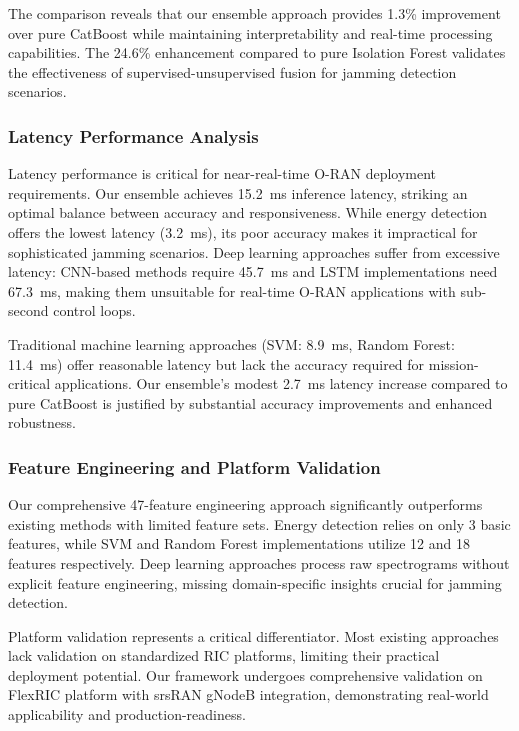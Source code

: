 \documentclass[journal]{IEEEtran}
\begin{document}
The comparison reveals that our ensemble approach provides 1.3\% improvement over pure CatBoost while maintaining interpretability and real-time processing capabilities. The 24.6\% enhancement compared to pure Isolation Forest validates the effectiveness of supervised-unsupervised fusion for jamming detection scenarios.

\subsubsection{Latency Performance Analysis}

Latency performance is critical for near-real-time O-RAN deployment requirements. Our ensemble achieves 15.2~ms inference latency, striking an optimal balance between accuracy and responsiveness. While energy detection offers the lowest latency (3.2~ms), its poor accuracy makes it impractical for sophisticated jamming scenarios. Deep learning approaches suffer from excessive latency: CNN-based methods require 45.7~ms and LSTM implementations need 67.3~ms, making them unsuitable for real-time O-RAN applications with sub-second control loops.

Traditional machine learning approaches (SVM: 8.9~ms, Random Forest: 11.4~ms) offer reasonable latency but lack the accuracy required for mission-critical applications. Our ensemble's modest 2.7~ms latency increase compared to pure CatBoost is justified by substantial accuracy improvements and enhanced robustness.

\subsubsection{Feature Engineering and Platform Validation}

Our comprehensive 47-feature engineering approach significantly outperforms existing methods with limited feature sets. Energy detection relies on only 3 basic features, while SVM and Random Forest implementations utilize 12 and 18 features respectively. Deep learning approaches process raw spectrograms without explicit feature engineering, missing domain-specific insights crucial for jamming detection.

Platform validation represents a critical differentiator. Most existing approaches lack validation on standardized RIC platforms, limiting their practical deployment potential. Our framework undergoes comprehensive validation on FlexRIC platform with srsRAN gNodeB integration, demonstrating real-world applicability and production-readiness.
\end{document}
